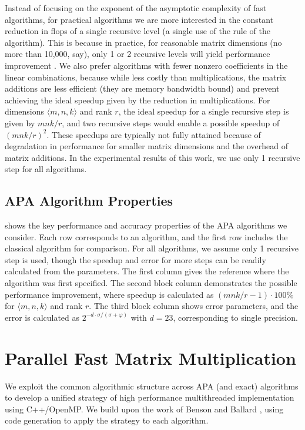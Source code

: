 \documentclass[conference]{IEEEtran}
\newcommand{\dims}[1]{\langle #1 \rangle}
\begin{document}
Instead of focusing on the exponent of the asymptotic complexity of fast algorithms, for practical algorithms we are more interested in the constant reduction in flops of a single recursive level (a single use of the rule of the algorithm).
This is because in practice, for reasonable matrix dimensions (no more than 10,000, say), only 1 or 2 recursive levels will yield performance improvement \cite{BB15}.
We also prefer algorithms with fewer nonzero coefficients in the linear combinations, because while less costly than multiplications, the matrix additions are less efficient (they are memory bandwidth bound) and prevent achieving the ideal speedup given by the reduction in multiplications.
For dimensions $\dims{m,n,k}$ and rank $r$, the ideal speedup for a single recursive step is given by $mnk/r$, and two recursive steps would enable a possible speedup of $(mnk/r)^2$.
These speedups are typically not fully attained because of degradation in performance for smaller matrix dimensions and the overhead of matrix additions.
In the experimental results of this work, we use only 1 recursive step for all algorithms.

\subsection{APA Algorithm Properties}
\label{sec:APAprops}

 shows the key performance and accuracy properties of the APA algorithms we consider.
Each row corresponds to an algorithm, and the first row includes the classical algorithm for comparison.
For all algorithms, we assume only 1 recursive step is used, though the speedup and error for more steps can be readily calculated from the parameters.
The first column gives the reference where the algorithm was first specified.
The second block column demonstrates the possible performance improvement, where speedup is calculated as $(mnk/r - 1)\cdot100\%$ for $\dims{m,n,k}$ and rank $r$.
The third block column shows error parameters, and the error is calculated as $2^{-d\cdot\sigma/(\sigma+\varphi)}$ with $d=23$, corresponding to single precision.

\section{Parallel Fast Matrix Multiplication}

We exploit the common algorithmic structure across APA (and exact) algorithms to develop a unified strategy of high performance multithreaded implementation using C++/OpenMP.
We build upon the work of Benson and Ballard \cite{BB15}, using code generation to apply the strategy to each algorithm.
\end{document}
